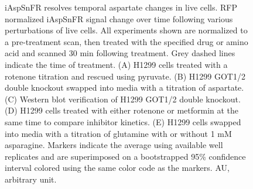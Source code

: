 \documentclass[9pt,lineno]{elife}
\begin{document}
\begin{figure}[ht!]
\centering
{}
\caption{
iAspSnFR resolves temporal aspartate changes in live cells.
RFP normalized iAspSnFR signal change over time following various perturbations of live cells.
All experiments shown are normalized to a pre-treatment scan, then treated with the specified drug or amino acid and scanned 30 min following treatment.
Grey dashed lines indicate the time of treatment.
(A) H1299 cells treated with a rotenone titration and rescued using pyruvate.
(B) H1299 GOT1/2 double knockout swapped into media with a titration of aspartate.
(C) Western blot verification of H1299 GOT1/2 double knockout.
(D) H1299 cells treated with either rotenone or metformin at the same time to compare inhibitor kinetics.
(E) H1299 cells swapped into media with a titration of glutamine with or without 1 mM asparagine.
Markers indicate the average using available well replicates and are superimposed on a bootstrapped 95\% confidence interval colored using the same color code as the markers. AU, arbitrary unit.
}
\label{fig:Fig2}
\end{figure}
\end{document}
